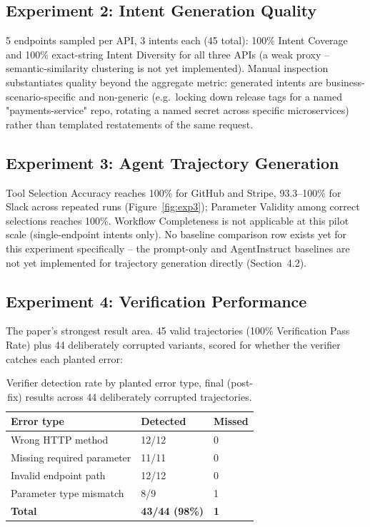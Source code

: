 \documentclass[11pt]{article}
\begin{document}
\subsection{Experiment 2: Intent Generation Quality}
5 endpoints sampled per API, 3 intents each (45 total): 100\% Intent Coverage and 100\%
exact-string Intent Diversity for all three APIs (a weak proxy -- semantic-similarity clustering
is not yet implemented). Manual inspection substantiates quality beyond the aggregate metric:
generated intents are business-scenario-specific and non-generic (e.g.\ locking down release tags
for a named "payments-service" repo, rotating a named secret across specific microservices) rather
than templated restatements of the same request.

\subsection{Experiment 3: Agent Trajectory Generation}
Tool Selection Accuracy reaches 100\% for GitHub and Stripe, 93.3--100\% for Slack across repeated
runs (Figure~\ref{fig:exp3}); Parameter Validity among correct selections reaches 100\%. Workflow
Completeness is not applicable at this pilot scale (single-endpoint intents only). No baseline
comparison row exists yet for this experiment specifically -- the prompt-only and AgentInstruct
baselines are not yet implemented for trajectory generation directly (Section~4.2).

\subsection{Experiment 4: Verification Performance}
The paper's strongest result area. 45 valid trajectories (100\% Verification Pass Rate) plus 44
deliberately corrupted variants, scored for whether the verifier catches each planted error:

\begin{table}[htbp]
\centering
\caption{Verifier detection rate by planted error type, final (post-fix) results across 44
deliberately corrupted trajectories.}
\label{tab:verifier-detection}
\begin{tabular}{lll}
\toprule
\textbf{Error type} & \textbf{Detected} & \textbf{Missed} \\
\midrule
Wrong HTTP method & 12/12 & 0 \\
Missing required parameter & 11/11 & 0 \\
Invalid endpoint path & 12/12 & 0 \\
Parameter type mismatch & 8/9 & 1 \\
\midrule
\textbf{Total} & \textbf{43/44 (98\%)} & \textbf{1} \\
\bottomrule
\end{tabular}
\end{table}
\end{document}

